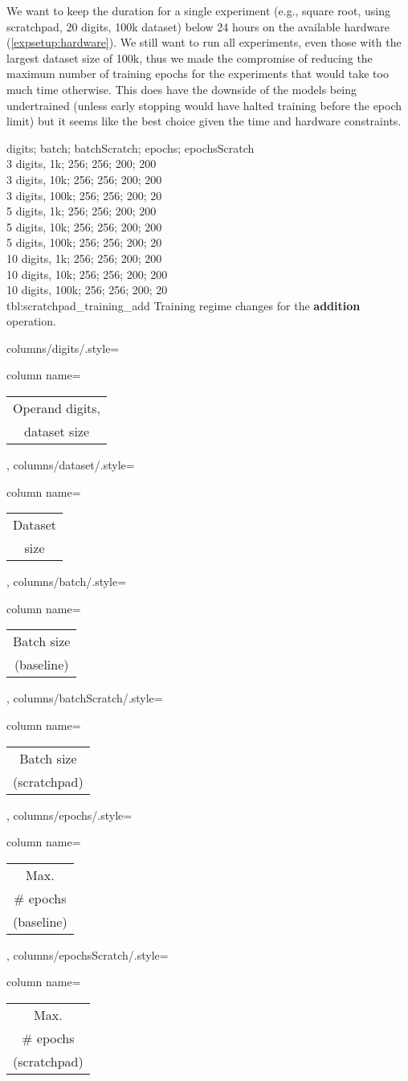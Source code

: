 We want to keep the duration for a single experiment (e.g., square root, using scratchpad, 20 digits, 100k dataset) below 24 hours on the available hardware (\cref{expsetup:hardware}).
We still want to run all experiments, even those with the largest dataset size of 100k, thus we made the compromise of reducing the maximum number of training epochs for the experiments that would take too much time otherwise. This does have the downside of the models being undertrained (unless early stopping would have halted training before the epoch limit) but it seems like the best choice given the time and hardware constraints.

{
	digits; batch; batchScratch; epochs; epochsScratch\\
	3 digits,  1k;  256; 256; 200; 200\\
	3 digits,  10k;  256; 256; 200; 200\\
	3 digits,  100k;  256; 256; 200; 20\\
	5 digits,  1k;  256; 256; 200; 200\\
	5 digits,  10k;  256; 256; 200; 200\\
	5 digits,  100k;  256; 256; 200; 20\\
	10 digits,  1k;  256; 256; 200; 200\\
	10 digits,  10k;  256; 256; 200; 200\\
	10 digits,  100k;  256; 256; 200; 20\\
}
{tbl:scratchpad_training_add}
{
	Training regime changes for the \textbf{addition} operation.
}
{%
	columns/digits/.style={column name={\begin{tabular}{c}
				Operand digits, \\
				dataset size
	\end{tabular}}},
	columns/dataset/.style={column name={\begin{tabular}{c}
				Dataset \\
				size
	\end{tabular}}},
	columns/batch/.style={column name={\begin{tabular}{c}
				Batch size \\
				(baseline)
	\end{tabular}}},
	columns/batchScratch/.style={column name={\begin{tabular}{c}
				Batch size \\
				(scratchpad)
	\end{tabular}}},
	columns/epochs/.style={column name={\begin{tabular}{c}
				Max. \\
				\# epochs \\
				(baseline)
	\end{tabular}}},
	columns/epochsScratch/.style={column name={\begin{tabular}{c}
				Max. \\
				\# epochs \\
				(scratchpad)
	\end{tabular}}}
}

